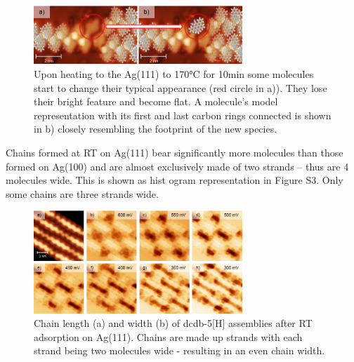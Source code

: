 \begin{figure} \centering
	\includegraphics[width=0.7\textwidth]{./images/paper/helicene/fig-S2}
	\caption{Upon heating to the Ag(111) to 170°C for 10min some molecules start to change their typical appearance (red circle in a)). They lose their bright feature and become flat. A molecule’s model representation with its first and last carbon rings connected is shown in b) closely resembling the footprint of the new species.}
	\label{fig:hel-fig-S2}
\end{figure}

Chains formed at RT on Ag(111) bear significantly more molecules than those formed on Ag(100) and are almost exclusively made of two strands – thus are 4 molecules wide. This is shown as hist	ogram representation in Figure S3. Only some chains are three strands wide.

\begin{figure} \centering
	\includegraphics[width=0.7\textwidth]{./images/paper/helicene/fig-S3}
	\caption{Chain length (a) and width (b) of dcdb-5[H] assemblies after RT adsorption on Ag(111). Chains are made up strands with each strand being two molecules wide - resulting in an even chain width.}
	\label{fig:hel-fig-S3}
\end{figure}

